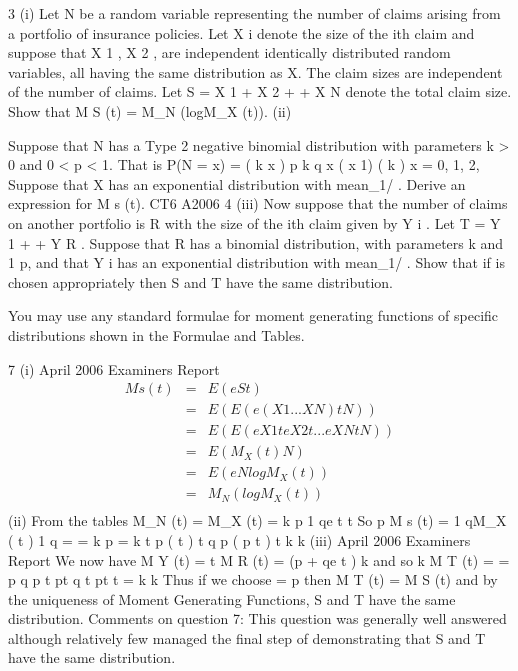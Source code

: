 \documentclass[a4paper,12pt]{article}
\begin{document}
3
(i) Let N be a random variable representing the number of claims arising from a
portfolio of insurance policies. Let X i denote the size of the ith claim and suppose that X 1 , X 2 , are independent identically distributed random variables, all having the same distribution as X. The claim sizes are
independent of the number of claims. Let S = X 1 + X 2 +
+ X N denote the
total claim size. Show that
M S (t) = M_{N} (logM_{X} (t)).
(ii)

Suppose that N has a Type 2 negative binomial distribution with parameters
k > 0 and 0 < p < 1. That is
P(N = x) =
( k x )
p k q x
( x 1) ( k )
x = 0, 1, 2,
Suppose that X has an exponential distribution with mean_{1}/ . Derive an
expression for M s (t).
CT6 A2006 4
(iii)
Now suppose that the number of claims on another portfolio is R with the size
of the ith claim given by Y i . Let T = Y 1 +
+ Y R . Suppose that R has a
binomial distribution, with parameters k and 1 p, and that Y i has an exponential distribution with mean_{1}/ . Show that if is chosen appropriately then S and T have the same distribution.

You may use any standard formulae for moment generating functions of specific distributions shown in the Formulae and Tables.
\newpage

7
(i)
April 2006
Examiners Report
\begin{eqnarray*}
M s (t) &=& E(e St )\\
&=& E ( E ( e ( X 1
... X N ) t
N ))\\
&=& E ( E ( e X 1 t e X 2 t ... e X N t N ))\\
&=& E ( M_{X} ( t ) N )\\
&=& E ( e N log M_{X} ( t ) )\\
&=& M_{N} (log M_{X} ( t ))\\
\end{eqnarray*}
(ii)
From the tables
M_{N} (t) =
M_{X} (t) =
k
p
1 qe t
t
So
p
M s (t) =
1 qM_{X} ( t )
1 q
=
=
k
p
=
k
t
p ( t )
t q
p (
p t )
t
k
k
(iii)
April 2006
Examiners Report
We now have
M Y (t) =
t
M R (t) = (p + qe t ) k
and so
k
M T (t) =
=
p q
p
t
pt q
t
pt
t
=
k
k
Thus if we choose = p then M T (t) = M S (t) and by the uniqueness of
Moment Generating Functions, S and T have the same distribution.
Comments on question 7: This question was generally well answered although relatively few
managed the final step of demonstrating that S and T have the same distribution.
\end{document}
